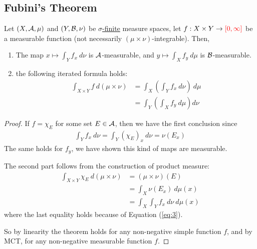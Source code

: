 \documentclass[11pt]{article}
\newcommand{\dmu}[0]{\ d\mu}
\begin{document}
	\subsection{Fubini's Theorem}
	\begin{theorem}
		Let $(X, \mathcal{{A}}, \mu)$ and $(Y, \mathcal{{B}}, \nu)$ be \ul{$\sigma$-finite} measure spaces, let $f: X \times Y \to \textcolor{red}{[0, \infty]}$ be a measurable function (not necessarily $(\mu \times \nu)$-integrable). Then,
		\begin{enumerate}
			\item The map $x \mapsto \int_Y f_x\ d\nu$ is $\mathcal{{A}}$-measurable, and $y \mapsto \int_X f_y\ d\mu$ is $\mathcal{{B}}$-measurable.
			\item the following iterated formula holds:
			\begin{align}
				\int_{X \times Y} f\ d(\mu \times \nu)
				&= \int_X \left(\int_Y f_x\ d\nu \right)\dmu \\
				&= \int_Y \left(\int_X f_y\dmu \right)d\nu
			\end{align}
		\end{enumerate}
		\begin{proof}
			If $f = \chi_E$ for some set $E \in \mathcal{{A}}$, then we have the first conclusion since
			\begin{align}
				\int_Y f_x\ d\nu = \int_Y (\chi_E)_x\ d\nu = \nu(E_x) \label{eq:3}
			\end{align}
			The same holds for $f_y$, we have shown this kind of maps are measurable.
			
			The second part follows from the construction of product measure:
			\begin{align}
				\int_{X \times Y} \chi_E\ d(\mu \times \nu) &= (\mu \times \nu)(E) \\
				&= \int_X \nu(E_x)\dmu(x) \\
				&= \int_X \int_Y f_x\ d\nu\dmu(x)
			\end{align}
			where the last equality holds because of Equation (\ref{eq:3}).
			
			So by linearity the theorem holds for any non-negative simple function $f$, and by MCT, for any non-negative measurable function $f$.
		\end{proof}
	\end{theorem}
	
\end{document}
